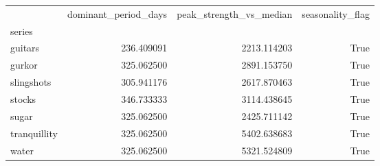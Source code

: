 \begin{tabular}{lrrr}
\toprule
 & dominant_period_days & peak_strength_vs_median & seasonality_flag \\
series &  &  &  \\
\midrule
guitars & 236.409091 & 2213.114203 & True \\
gurkor & 325.062500 & 2891.153750 & True \\
slingshots & 305.941176 & 2617.870463 & True \\
stocks & 346.733333 & 3114.438645 & True \\
sugar & 325.062500 & 2425.711142 & True \\
tranquillity & 325.062500 & 5402.638683 & True \\
water & 325.062500 & 5321.524809 & True \\
\bottomrule
\end{tabular}
